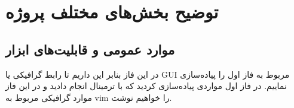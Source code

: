 \section*{{\titr توضیح بخش‌های مختلف پروژه}}

\subsection*{{\titr موارد عمومی و قابلیت‌های ابزار}}


در این فاز بنابر این داریم تا رابط گرافیکی یا GUI مربوط به فاز اول را پیاده‌سازی نماییم. در فاز اول مواردی پیاده‌سازی کردید که با ترمینال انجام دادید و در این فاز موارد گرافیکی مربوط به vim را خواهیم نوشت.













